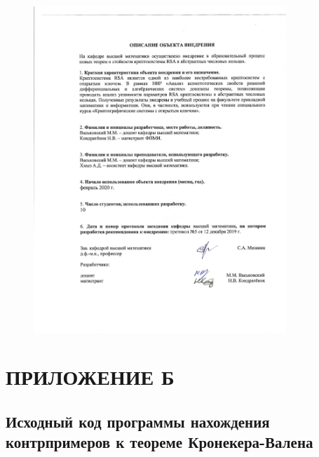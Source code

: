 \documentclass[_00_dissertation.tex]{subfiles}
\begin{document}
\begin{figure}[ht!]
    \centering
    \includegraphics[width=0.85\textwidth]{../additional/Act_KondratyonokNV_page-0002.jpg}
\end{figure}

\chapter*{\hfill \MakeUppercase{Приложение Б}}
\section*{Исходный код программы нахождения контрпримеров к теореме Кронекера-Валена}\label{section:Appendix_code}



\onlyinsubfile{
    
}
\end{document}
